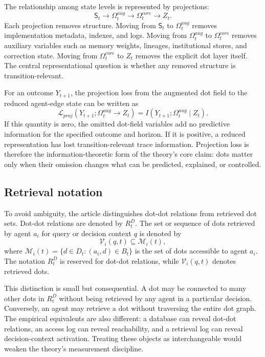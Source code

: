 \documentclass[11pt]{article}
\theoremstyle{remark}
\begin{document}
The relationship among state levels is represented by projections:
\[
\mathsf S_t \to \Omega_t^{aug} \to \Omega_t^{core} \to Z_t.
\]
Each projection removes structure. Moving from $\mathsf S_t$ to $\Omega_t^{aug}$ removes implementation metadata, indexes, and logs. Moving from $\Omega_t^{aug}$ to $\Omega_t^{core}$ removes auxiliary variables such as memory weights, lineages, institutional stores, and correction state. Moving from $\Omega_t^{core}$ to $Z_t$ removes the explicit dot layer itself. The central representational question is whether any removed structure is transition-relevant.

For an outcome $Y_{t+1}$, the projection loss from the augmented dot field to the reduced agent-edge state can be written as
\[
\mathcal L_{proj}(Y_{t+1};\Omega_t^{aug}\to Z_t)
=I(Y_{t+1};\Omega_t^{aug}\mid Z_t).
\]
If this quantity is zero, the omitted dot-field variables add no predictive information for the specified outcome and horizon. If it is positive, a reduced representation has lost transition-relevant trace information. Projection loss is therefore the information-theoretic form of the theory's core claim: dots matter only when their omission changes what can be predicted, explained, or controlled.

\subsection{Retrieval notation}\label{retrieval-notation}

To avoid ambiguity, the article distinguishes dot-dot relations from retrieved dot sets. Dot-dot relations are denoted by $R_t^D$. The set or sequence of dots retrieved by agent $a_i$ for query or decision context $q$ is denoted by
\[
\mathcal V_i(q,t)\subseteq \mathcal M_i(t),
\]
where $\mathcal M_i(t)=\{d\in D_t:(a_i,d)\in B_t\}$ is the set of dots accessible to agent $a_i$. The notation $R_t^D$ is reserved for dot-dot relations, while $\mathcal V_i(q,t)$ denotes retrieved dots.

This distinction is small but consequential. A dot may be connected to many other dots in $R_t^D$ without being retrieved by any agent in a particular decision. Conversely, an agent may retrieve a dot without traversing the entire dot graph. The empirical equivalents are also different: a database can reveal dot-dot relations, an access log can reveal reachability, and a retrieval log can reveal decision-context activation. Treating these objects as interchangeable would weaken the theory's measurement discipline.
\end{document}
